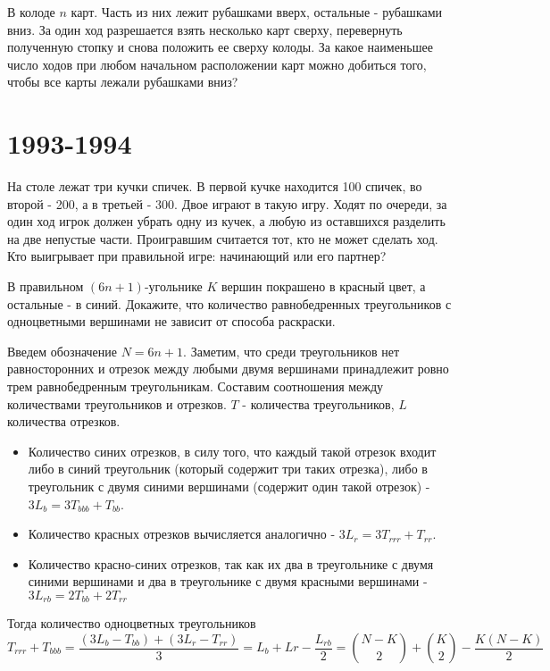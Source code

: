\documentclass[11pt, a4paper]{template}
\begin{document}
\begin{exercise}
В колоде $n$ карт. Часть из них лежит рубашками вверх, остальные - рубашками вниз. За один ход разрешается взять несколько карт сверху, перевернуть полученную стопку и снова положить ее сверху колоды. За какое наименьшее число ходов при любом начальном расположении карт можно добиться того, чтобы все карты лежали рубашками вниз?
\end{exercise}

\chapter{1993-1994}

\begin{exercise}
На столе лежат три кучки спичек. В первой кучке находится 100 спичек, во второй - 200, а в третьей - 300. Двое играют в такую игру. Ходят по очереди, за один ход игрок должен убрать одну из кучек, а любую из оставшихся разделить на две непустые части. Проигравшим считается тот, кто не может сделать ход. Кто выигрывает при правильной игре: начинающий или его партнер?
\end{exercise}

\begin{exercise}
В правильном $(6n+1)$-угольнике $K$ вершин покрашено в красный цвет, а остальные - в синий. Докажите, что количество равнобедренных треугольников с одноцветными вершинами не зависит от способа раскраски.
\end{exercise}

\begin{solution}
Введем обозначение $N = 6n + 1$. Заметим, что среди треугольников нет равносторонних и отрезок между любыми двумя вершинами принадлежит ровно трем равнобедренным треугольникам. Составим соотношения между количествами треугольников и отрезков. $T$ - количества треугольников, $L$  количества отрезков.
\begin{itemize}
\item Количество синих отрезков, в силу того, что каждый такой отрезок входит либо в синий треугольник (который содержит три таких отрезка), либо в треугольник с двумя синими вершинами (содержит один такой отрезок) - $3L_{b} = 3 T_{bbb} + T_{bb}$.
\item Количество красных отрезков вычисляется аналогично - $3L_{r} = 3T_{rrr} + T_{rr}$.
\item Количество красно-синих отрезков, так как их два в треугольнике с двумя синими вершинами и два в треугольнике с двумя красными вершинами - $3L_{rb} = 2T_{bb}+2T_{rr}$
\end{itemize}
Тогда количество одноцветных треугольников
$$
T_{rrr} + T_{bbb} = \frac{(3L_{b} - T_{bb}) + (3L_{r} - T_{rr})}{3} = L_{b} + L{r} - \frac{L_{rb}}{2} = \binom{N - K}{2} + \binom{K}{2} - \frac{K(N - K)}{2}
$$
\end{solution}
\end{document}

